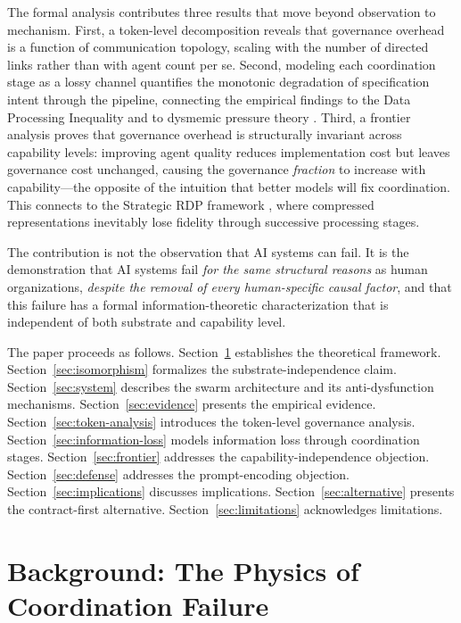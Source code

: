 \documentclass[11pt,a4paper]{article}
\begin{document}
The formal analysis contributes three results that move beyond observation to mechanism. First, a token-level decomposition reveals that governance overhead is a function of communication topology, scaling with the number of directed links rather than with agent count per se. Second, modeling each coordination stage as a lossy channel quantifies the monotonic degradation of specification intent through the pipeline, connecting the empirical findings to the Data Processing Inequality and to dysmemic pressure theory \citep{mcentire2025a}. Third, a frontier analysis proves that governance overhead is structurally invariant across capability levels: improving agent quality reduces implementation cost but leaves governance cost unchanged, causing the governance \emph{fraction} to increase with capability---the opposite of the intuition that better models will fix coordination. This connects to the Strategic RDP framework \citep{mcentire2025channel}, where compressed representations inevitably lose fidelity through successive processing stages.

The contribution is not the observation that AI systems can fail. It is the demonstration that AI systems fail \emph{for the same structural reasons} as human organizations, \emph{despite the removal of every human-specific causal factor}, and that this failure has a formal information-theoretic characterization that is independent of both substrate and capability level.

The paper proceeds as follows. Section~\ref{sec:background} establishes the theoretical framework. Section~\ref{sec:isomorphism} formalizes the substrate-independence claim. Section~\ref{sec:system} describes the swarm architecture and its anti-dysfunction mechanisms. Section~\ref{sec:evidence} presents the empirical evidence. Section~\ref{sec:token-analysis} introduces the token-level governance analysis. Section~\ref{sec:information-loss} models information loss through coordination stages. Section~\ref{sec:frontier} addresses the capability-independence objection. Section~\ref{sec:defense} addresses the prompt-encoding objection. Section~\ref{sec:implications} discusses implications. Section~\ref{sec:alternative} presents the contract-first alternative. Section~\ref{sec:limitations} acknowledges limitations.


\section{Background: The Physics of Coordination Failure}
\label{sec:background}
\end{document}
